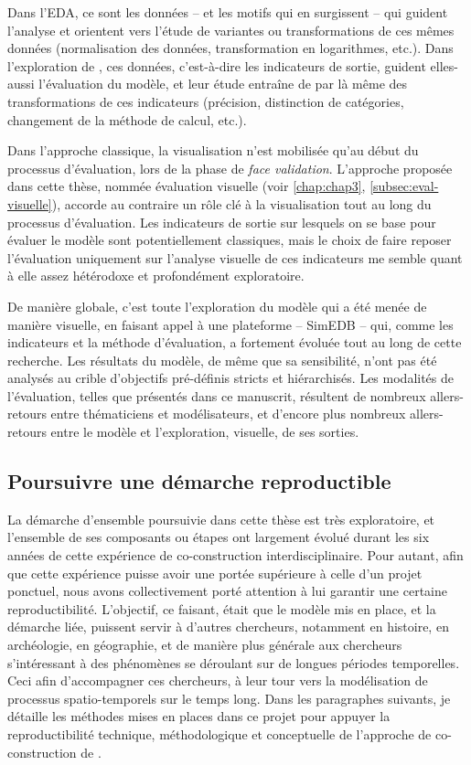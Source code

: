 Dans l'EDA, ce sont les données -- et les motifs qui en surgissent -- qui guident l'analyse et orientent vers l'étude de variantes ou transformations de ces mêmes données (normalisation des données, transformation en logarithmes, etc.).
Dans l'exploration de \simfeodal{}, ces \og données\fg{}, c'est-à-dire les indicateurs de sortie, guident elles-aussi l'évaluation du modèle, et leur étude entraîne de par là même des transformations de ces indicateurs (précision, distinction de catégories, changement de la méthode de calcul, etc.).

Dans l'approche classique, la visualisation n'est mobilisée qu'au début du processus d'évaluation, lors de la phase de \og \textit{face validation}\fg{}.
L'approche proposée dans cette thèse, nommée \og évaluation visuelle\fg{} (voir \cref{chap:chap3}, \cref{subsec:eval-visuelle}), accorde au contraire un rôle clé à la visualisation tout au long du processus d'évaluation.
Les indicateurs de sortie sur lesquels on se base pour évaluer le modèle sont potentiellement classiques, mais le choix de faire reposer l'évaluation uniquement sur l'analyse visuelle de ces indicateurs me semble quant à elle assez hétérodoxe et profondément exploratoire.

De manière globale, c'est toute l'exploration du modèle qui a été menée de manière visuelle, en faisant appel à une plateforme -- SimEDB -- qui, comme les indicateurs et la méthode d'évaluation, a fortement évoluée tout au long de cette recherche.
Les \og résultats\fg{} du modèle, de même que sa sensibilité, n'ont pas été analysés au crible d'objectifs pré-définis stricts et hiérarchisés.
Les modalités de l'évaluation, telles que présentés dans ce manuscrit, résultent de nombreux allers-retours entre thématiciens et modélisateurs, et d'encore plus nombreux allers-retours entre le modèle et l'exploration, visuelle, de ses sorties.


\subsection{Poursuivre une démarche reproductible \label{subsec:demarche-reproductible}}

La démarche d'ensemble poursuivie dans cette thèse est très exploratoire, et l'ensemble de ses composants ou étapes ont largement évolué durant les six années de cette expérience de co-construction interdisciplinaire.
Pour autant, afin que cette expérience puisse avoir une portée supérieure à celle d'un projet ponctuel, nous avons collectivement porté attention à lui garantir une certaine reproductibilité.
L'objectif, ce faisant, était que le modèle mis en place, et la démarche liée, puissent servir à d'autres chercheurs, notamment en histoire, en archéologie, en géographie, et de manière plus générale aux chercheurs s'intéressant à des phénomènes se déroulant sur de longues périodes temporelles.
Ceci afin d'accompagner ces chercheurs, à leur tour vers la modélisation de processus spatio-temporels sur le temps long.
Dans les paragraphes suivants, je détaille les méthodes mises en places dans ce projet pour appuyer la reproductibilité technique, méthodologique et conceptuelle de l'approche de co-construction de \simfeodal{}.

